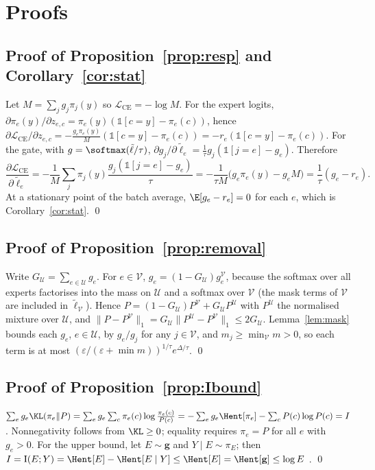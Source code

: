 \section{Proofs}\label{app:proofs}
\subsection*{Proof of Proposition~\ref{prop:resp} and Corollary~\ref{cor:stat}}
Let $M=\sum_jg_j\pi_j(y)$ so $\mathcal{L}_{\mathrm{CE}}=-\log M$. For the expert logits, $\partial\pi_e(y)/\partial z_{e,c}=\pi_e(y)(\mathbb 1[c=y]-\pi_e(c))$, hence
$\partial\mathcal{L}_{\mathrm{CE}}/\partial z_{e,c}=-\frac{g_e\pi_e(y)}{M}(\mathbb 1[c=y]-\pi_e(c))=-r_e(\mathbb 1[c=y]-\pi_e(c))$.
For the gate, with $g=\softmax(\tilde\ell/\tau)$, $\partial g_j/\partial\tilde\ell_e=\frac1\tau g_j(\mathbb 1[j=e]-g_e)$. Therefore
\[\frac{\partial\mathcal{L}_{\mathrm{CE}}}{\partial\tilde\ell_e}=-\frac1M\sum_j\pi_j(y)\frac{g_j(\mathbb 1[j=e]-g_e)}{\tau}=-\frac1{\tau M}\big(g_e\pi_e(y)-g_eM\big)=\frac{1}{\tau}(g_e-r_e).\]
At a stationary point of the batch average, $\E[g_e-r_e]=0$ for each $e$, which is Corollary~\ref{cor:stat}. \qed

\subsection*{Proof of Proposition~\ref{prop:removal}}
Write $G_{\mathcal U}=\sum_{e\in\mathcal U}g_e$. For $e\in\mathcal V$, $g_e=(1-G_{\mathcal U})g^{\mathcal V}_e$, because the softmax over all experts factorises into the mass on $\mathcal U$ and a softmax over $\mathcal V$ (the mask terms of $\mathcal V$ are included in $\tilde\ell_{\mathcal V}$). Hence $P=(1-G_{\mathcal U})P^{\mathcal V}+G_{\mathcal U}P^{\mathcal U}$ with $P^{\mathcal U}$ the normalised mixture over $\mathcal U$, and $\|P-P^{\mathcal V}\|_1=G_{\mathcal U}\|P^{\mathcal U}-P^{\mathcal V}\|_1\le2G_{\mathcal U}$. Lemma~\ref{lem:mask} bounds each $g_e$, $e\in\mathcal U$, by $g_e/g_j$ for any $j\in\mathcal V$, and $m_j\ge\min_{\mathcal V}m>0$, so each term is at most $(\varepsilon/(\varepsilon+\min m))^{1/\tau}e^{\Delta/\tau}$. \qed

\subsection*{Proof of Proposition~\ref{prop:Ibound}}
$\sum_eg_e\KL(\pi_e\|P)=\sum_eg_e\sum_c\pi_e(c)\log\frac{\pi_e(c)}{P(c)}=-\sum_eg_e\Hent[\pi_e]-\sum_cP(c)\log P(c)=I$. Nonnegativity follows from $\KL\ge0$; equality requires $\pi_e=P$ for all $e$ with $g_e>0$. For the upper bound, let $E\sim\mathbf g$ and $Y\mid E\sim\pi_E$; then $I=\mathrm{I}(E;Y)=\Hent[E]-\Hent[E\mid Y]\le\Hent[E]=\Hent[\mathbf g]\le\log E$ \cite{b69}. \qed

